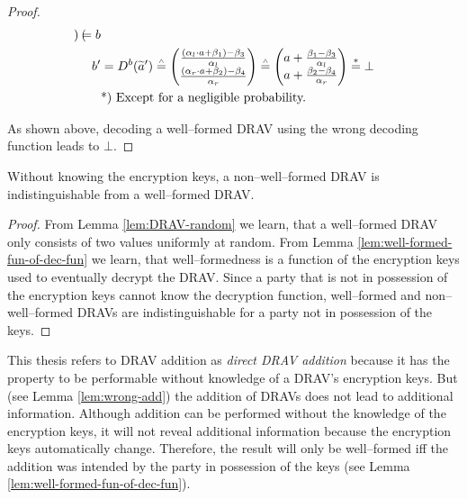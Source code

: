 \begin{proof}
\begin{align*}
\begin{pmatrix}
    \end{pmatrix}
    = b\\
    b' &= D^b(\widetilde{a}')
    \stackrel{\scriptscriptstyle\wedge}{=}
    \begin{pmatrix}
      \frac{(\alpha_l \cdot a + \beta_1) - \beta_3}{\alpha_l}\\
      \frac{(\alpha_r \cdot a + \beta_2) - \beta_4}{\alpha_r}\\
    \end{pmatrix}
    \stackrel{\scriptscriptstyle\wedge}{=}
    \begin{pmatrix}
      a +
      \frac{\beta_1 - \beta_3}{\alpha_l}\\
      a +
      \frac{\beta_2 - \beta_4}{\alpha_r}\\
    \end{pmatrix}
    \stackrel{*}{=} \bot\\
    &\text{*) Except for a negligible probability.}{}
  \end{align*}

  \noindent{}As shown above, decoding a well--formed DRAV using the wrong
  decoding function leads to $\bot$.

\end{proof}


\begin{lem}
  \label{lem:DRAV-indistinguishable}

  Without knowing the encryption keys, a non--well--formed DRAV is
  indistinguishable from a well--formed DRAV\@.

\end{lem}
\begin{proof}

  From Lemma \ref{lem:DRAV-random} we learn, that a well--formed DRAV only
  consists of two values uniformly at random. From Lemma
  \ref{lem:well-formed-fun-of-dec-fun} we learn, that well--formedness is a
  function of the encryption keys used to eventually decrypt the DRAV\@. Since a
  party that is not in possession of the encryption keys cannot know the
  decryption function, well--formed and non--well--formed DRAVs are
  indistinguishable for a party not in possession of the keys.

\end{proof}


\label{sec:DRAV-addition}

This thesis refers to DRAV addition as \emph{direct DRAV addition} because it
has the property to be performable without knowledge of a DRAV's encryption
keys. But (see Lemma \ref{lem:wrong-add}) the addition of DRAVs does not lead to
additional information. Although addition can be performed without the knowledge
of the encryption keys, it will not reveal additional information because the
encryption keys automatically change. Therefore, the result will only be
well--formed iff the addition was intended by the party in possession of the
keys (see Lemma \ref{lem:well-formed-fun-of-dec-fun}).

